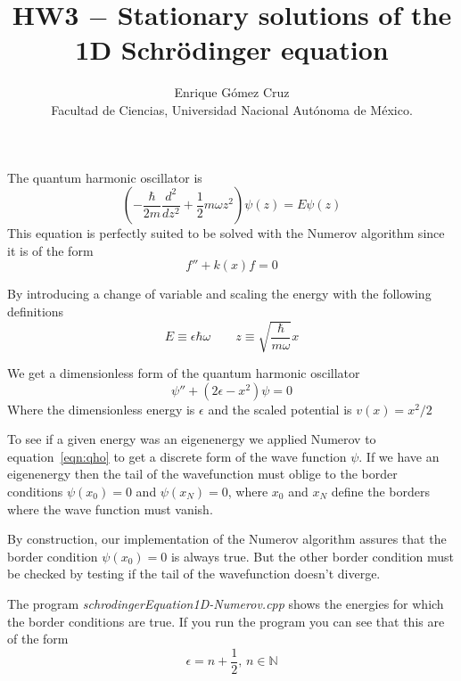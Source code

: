 \documentclass[11pt]{article}
\title{HW3 $-$ Stationary solutions of the 1D Schrödinger equation}
\author{Enrique Gómez Cruz\\Facultad de Ciencias, Universidad Nacional Autónoma de México.}
\date{}
\begin{document}
\maketitle
  
The quantum harmonic oscillator is
\begin{equation*}
  \left(-\frac{\hbar}{2m} \frac{d^2}{dz^2}+\frac{1}{2}m\omega z^2 \right)\psi(z) = E\psi(z)
\end{equation*}
This equation is perfectly suited to be solved with the Numerov algorithm since it is of the form
\begin{equation*}
  f'' + k(x) f = 0
\end{equation*}

By introducing a change of variable and scaling the energy with the following definitions
\begin{equation*}
  E\equiv \epsilon\hbar\omega \qquad z\equiv \sqrt{\frac{\hbar}{m\omega}} x
\end{equation*}

We get a dimensionless form of the quantum harmonic oscillator
\begin{equation}
  \psi''+(2\epsilon - x^2)\psi = 0
  \label{eqn:qho}
\end{equation}
Where the dimensionless energy is $\epsilon$ and the scaled potential is $v(x) = x^2/2$

To see if a given energy was an eigenenergy we applied Numerov to equation~\ref{eqn:qho} to get a discrete form of the wave function $\psi$.  If we have an eigenenergy then the tail of the wavefunction must oblige to the border conditions $\psi(x_0) = 0$ and $\psi(x_N) = 0$, where $x_0$ and $x_N$ define the borders where the wave function must vanish.

By construction, our implementation of the Numerov algorithm assures that the border condition $\psi(x_0) = 0$ is always true. But the other border condition must be checked by testing if the tail of the wavefunction doesn't diverge.

The program \textit{schrodingerEquation1D-Numerov.cpp} shows the energies for which the border conditions are true. If you run the program you can see that this are of the form
\begin{equation*}
  \epsilon = n +\frac{1}{2}\text{, } n \in \mathds{N}
\end{equation*}
\end{document}

